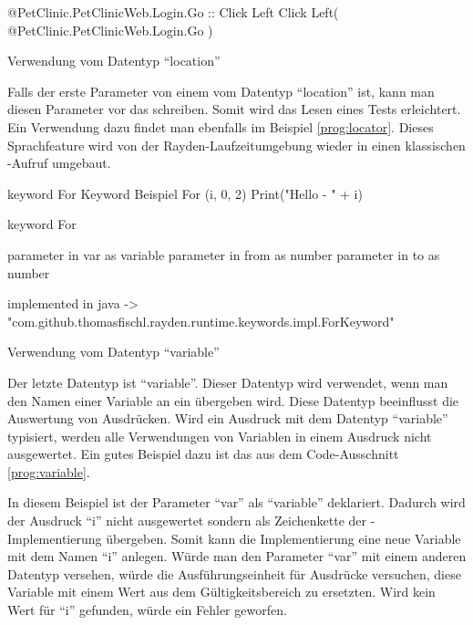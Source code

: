 \begin{program}
\begin{JavaCode}
@PetClinic.PetClinicWeb.Login.Go :: Click Left
Click Left( @PetClinic.PetClinicWeb.Login.Go )
\end{JavaCode}
\caption{Verwendung vom Datentyp "`location"'}
\label{prog:locator}
\end{program}

\SuperPar
Falls der erste Parameter von einem  vom Datentyp "`location"' ist, kann man diesen Parameter vor das  schreiben. Somit wird das Lesen eines Tests erleichtert. Ein Verwendung dazu findet man ebenfalls im Beispiel \ref{prog:locator}. Dieses Sprachfeature wird von der Rayden-Laufzeitumgebung wieder in einen klassischen -Aufruf umgebaut.

\begin{program}
\begin{JavaCode}

keyword For Keyword Beispiel{
	For (i, 0, 2){
		Print("Hello - " + i)
	}
}

keyword For { 
	parameter in var as variable
	parameter in from as number
	parameter in to as number

	implemented in java -> "com.github.thomasfischl.rayden.runtime.keywords.impl.ForKeyword"
}
\end{JavaCode}
\caption{Verwendung vom Datentyp "`variable"'}
\label{prog:variable}
\end{program}

\SuperPar
Der letzte Datentyp ist "`variable"'. Dieser Datentyp wird verwendet, wenn man den Namen einer Variable an ein  übergeben wird. Diese Datentyp beeinflusst die Auswertung von Ausdrücken. Wird ein Ausdruck mit dem Datentyp "`variable"' typisiert, werden alle Verwendungen von Variablen in einem Ausdruck nicht ausgewertet. Ein gutes Beispiel dazu ist das  aus dem Code-Ausschnitt \ref{prog:variable}.

\SuperPar
In diesem Beispiel ist der Parameter "`var"' als "`variable"' deklariert. Dadurch wird der Ausdruck "`i"' nicht ausgewertet sondern als Zeichenkette der -Implementierung übergeben. Somit kann die Implementierung eine neue Variable mit dem Namen "`i"' anlegen. Würde man den Parameter "`var"' mit einem anderen Datentyp versehen, würde die Ausführungseinheit für Ausdrücke versuchen, diese Variable mit einem Wert aus dem Gültigkeitsbereich zu ersetzten. Wird kein Wert für "`i"' gefunden, würde ein Fehler geworfen.

